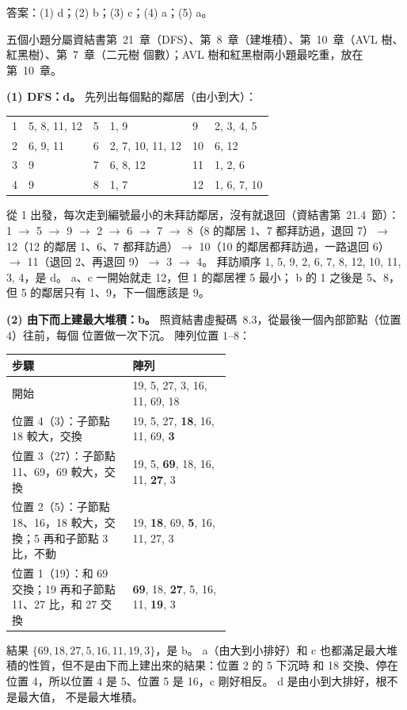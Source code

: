 \begin{pastsoln}
答案：(1) d；(2) b；(3) c；(4) a；(5) a。

五個小題分屬資結書第~21~章（DFS）、第~8~章（建堆積）、第~10~章（AVL 樹、紅黑樹）、第~7~章（二元樹
個數）；AVL 樹和紅黑樹兩小題最吃重，放在第~10~章。

\textbf{(1) DFS：d。} 先列出每個點的鄰居（由小到大）：
\begin{center}
\small
\begin{tabular}{ll@{\qquad}ll@{\qquad}ll}
1 & 5, 8, 11, 12 & 5 & 1, 9 & 9 & 2, 3, 4, 5 \\
2 & 6, 9, 11 & 6 & 2, 7, 10, 11, 12 & 10 & 6, 12 \\
3 & 9 & 7 & 6, 8, 12 & 11 & 1, 2, 6 \\
4 & 9 & 8 & 1, 7 & 12 & 1, 6, 7, 10 \\
\end{tabular}
\end{center}
從 1 出發，每次走到編號最小的未拜訪鄰居，沒有就退回（資結書第~21.4~節）：
1 $\to$ 5 $\to$ 9 $\to$ 2 $\to$ 6 $\to$ 7 $\to$ 8（8 的鄰居 1、7 都拜訪過，退回 7）$\to$ 12（12 的鄰居
1、6、7 都拜訪過）$\to$ 10（10 的鄰居都拜訪過，一路退回 6）$\to$ 11（退回 2、再退回 9）$\to$ 3
$\to$ 4。 拜訪順序 1, 5, 9, 2, 6, 7, 8, 12, 10, 11, 3, 4，是 d。 a、c 一開始就走 12，但 1 的鄰居裡 5 最小；
b 的 1 之後是 5、8，但 5 的鄰居只有 1、9，下一個應該是 9。

\textbf{(2) 由下而上建最大堆積：b。} 照資結書虛擬碼~8.3，從最後一個內部節點（位置 $4$）往前，每個
位置做一次下沉。 陣列位置 $1$--$8$：
\begin{center}
\small
\begin{tabular}{>{\raggedright\arraybackslash}p{0.55\linewidth}l}
\toprule
步驟 & 陣列 \\
\midrule
開始 & 19, 5, 27, 3, 16, 11, 69, 18 \\
位置 4（3）：子節點 18 較大，交換 & 19, 5, 27, \textbf{18}, 16, 11, 69, \textbf{3} \\
位置 3（27）：子節點 11、69，69 較大，交換 & 19, 5, \textbf{69}, 18, 16, 11, \textbf{27}, 3 \\
位置 2（5）：子節點 18、16，18 較大，交換；5 再和子節點 3 比，不動 & 19, \textbf{18}, 69, \textbf{5}, 16, 11, 27, 3 \\
位置 1（19）：和 69 交換；19 再和子節點 11、27 比，和 27 交換 & \textbf{69}, 18, \textbf{27}, 5, 16, 11, \textbf{19}, 3 \\
\bottomrule
\end{tabular}
\end{center}
結果 $\{69, 18, 27, 5, 16, 11, 19, 3\}$，是 b。 a（由大到小排好）和 c 也都滿足最大堆積的性質，但不是由下而上建出來的結果：位置 2 的 5 下沉時
和 18 交換、停在位置 4，所以位置 4 是 5、位置 5 是 16，c 剛好相反。 d 是由小到大排好，根不是最大值，
不是最大堆積。


\end{pastsoln}
